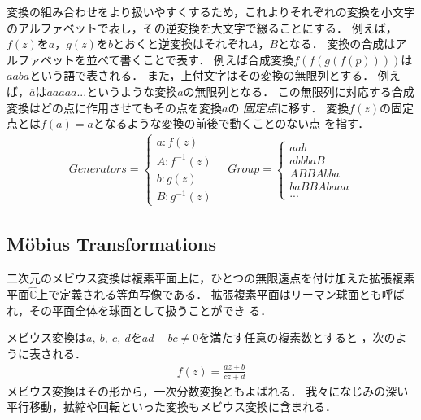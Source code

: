 変換の組み合わせをより扱いやすくするため，これよりそれぞれの変換を小文字
のアルファベットで表し，その逆変換を大文字で綴ることにする．
例えば，$f(z)$を$a$，$g(z)$を$b$とおくと逆変換はそれぞれ$A$，$B$となる．
変換の合成はアルファベットを並べて書くことで表す．
例えば合成変換$f(f(g(f(p))))$は$aaba$という語で表される．
また，上付文字はその変換の無限列とする．
例えば，$\overline{a}$は$aaaaa...$というような変換$a$の無限列となる．
この無限列に対応する合成変換はどの点に作用させてもその点を変換$a$の
\emph{固定点}に移す．
変換$f(z)$の固定点とは$f(a) = a$となるような変換の前後で動くことのない点
を指す．
 \begin{align*}
  Generators =
   \begin{cases}
    a \colon f(z) \\
    A \colon f^{-1}(z) \\
    b \colon g(z) \\
    B \colon g^{-1}(z)
   \end{cases}
  \quad
  Group =
   \begin{cases}
    aab\\
    abbbaB \\
    ABBAbba \\
    baBBAbaaa \\
    ...
   \end{cases}
 \end{align*}

\subsection{M\"obius Transformations}

二次元のメビウス変換は複素平面上に，ひとつの無限遠点を付け加えた拡張複素
平面$\hat{\mathbb{C}}$上で定義される等角写像である．
拡張複素平面はリーマン球面とも呼ばれ，その平面全体を球面として扱うことができ
る．

メビウス変換は$a,~b,~c,~d$を$ad - bc \neq 0$を満たす任意の複素数とすると
，次のように表される．
\begin{align*}
 f(z) = \frac{az + b}{cz + d}
\end{align*}
メビウス変換はその形から，一次分数変換ともよばれる．
我々になじみの深い平行移動，拡縮や回転といった変換もメビウス変換に含まれる．

